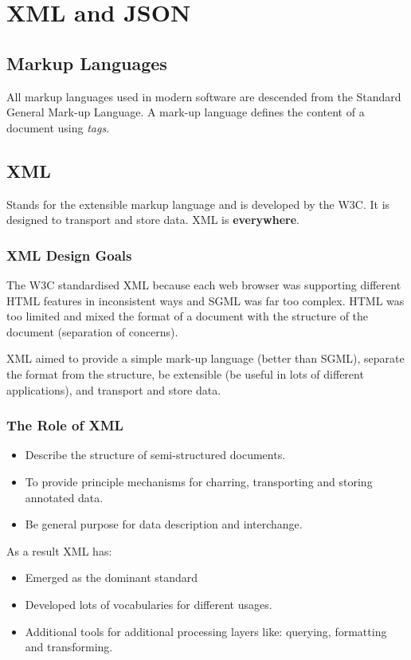 \section{XML and JSON}\label{sec:xml_and_json}

\subsection{Markup Languages}\label{sub:markup_languages}

All markup languages used in modern software are descended from the Standard General Mark-up Language.
A mark-up language defines the content of a document using \emph{tags}.

\subsection{XML}\label{sub:xml}

Stands for the extensible markup language and is developed by the W3C.
It is designed to transport and store data.
XML is \textbf{everywhere}.

\subsubsection{XML Design Goals}\label{ssub:xml_design_goals}

The W3C standardised XML because each web browser was supporting different HTML features in inconsistent ways and SGML was far too complex.
HTML was too limited and mixed the format of a document with the structure of the document (separation of concerns).

XML aimed to provide a simple mark-up language (better than SGML), separate the format from the structure, be extensible (be useful in lots of different applications), and transport and store data.

\subsubsection{The Role of XML}\label{ssub:the_role_of_xml}

\begin{itemize}
    \item Describe the structure of semi-structured documents.
    \item To provide principle mechanisms for charring, transporting and storing annotated data.
    \item Be general purpose for data description and interchange.
\end{itemize}
As a result XML has:
\begin{itemize}
    \item Emerged as the dominant standard
    \item Developed lots of vocabularies for different usages.
    \item Additional tools for additional processing layers like: querying, formatting and transforming.
\end{itemize}


